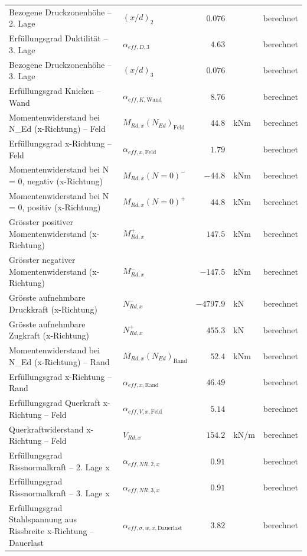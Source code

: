 \documentclass[11pt,a4paper]{article}
\begin{document}
\begin{xltabular}{\linewidth}{>{\raggedright\arraybackslash}Xlrll}
Bezogene Druckzonenhöhe – 2. Lage & $\left(x/d\right)_{2}$ & $0.076$ &  & berechnet \\
Erfüllungsgrad Duktilität – 3. Lage & $\alpha_{eff,D,3}$ & $4.63$ &  & berechnet \\
Bezogene Druckzonenhöhe – 3. Lage & $\left(x/d\right)_{3}$ & $0.076$ &  & berechnet \\
Erfüllungsgrad Knicken – Wand & $\alpha_{eff,K,\text{Wand}}$ & $8.76$ &  & berechnet \\
Momentenwiderstand bei N\_Ed (x-Richtung) – Feld & $M_{Rd,x}(N_{Ed})_{\text{Feld}}$ & $44.8$ & kNm & berechnet \\
Erfüllungsgrad x-Richtung – Feld & $\alpha_{eff,x,\text{Feld}}$ & $1.79$ &  & berechnet \\
Momentenwiderstand bei N = 0, negativ (x-Richtung) & $M_{Rd,x}(N=0)^{-}$ & $-44.8$ & kNm & berechnet \\
Momentenwiderstand bei N = 0, positiv (x-Richtung) & $M_{Rd,x}(N=0)^{+}$ & $44.8$ & kNm & berechnet \\
Grösster positiver Momentenwiderstand (x-Richtung) & $M_{Rd,x}^{+}$ & $147.5$ & kNm & berechnet \\
Grösster negativer Momentenwiderstand (x-Richtung) & $M_{Rd,x}^{-}$ & $-147.5$ & kNm & berechnet \\
Grösste aufnehmbare Druckkraft (x-Richtung) & $N_{Rd,x}^{-}$ & $-4797.9$ & kN & berechnet \\
Grösste aufnehmbare Zugkraft (x-Richtung) & $N_{Rd,x}^{+}$ & $455.3$ & kN & berechnet \\
Momentenwiderstand bei N\_Ed (x-Richtung) – Rand & $M_{Rd,x}(N_{Ed})_{\text{Rand}}$ & $52.4$ & kNm & berechnet \\
Erfüllungsgrad x-Richtung – Rand & $\alpha_{eff,x,\text{Rand}}$ & $46.49$ &  & berechnet \\
Erfüllungsgrad Querkraft x-Richtung – Feld & $\alpha_{eff,V,x,\text{Feld}}$ & $5.14$ &  & berechnet \\
Querkraftwiderstand x-Richtung – Feld & $V_{Rd,x}$ & $154.2$ & kN/m & berechnet \\
Erfüllungsgrad Rissnormalkraft – 2. Lage x & $\alpha_{eff,NR,2,x}$ & $0.91$ &  & berechnet \\
Erfüllungsgrad Rissnormalkraft – 3. Lage x & $\alpha_{eff,NR,3,x}$ & $0.91$ &  & berechnet \\
Erfüllungsgrad Stahlspannung aus Rissbreite x-Richtung – Dauerlast & $\alpha_{eff,\sigma,w,x,\text{Dauerlast}}$ & $3.82$ &  & berechnet \\

\end{xltabular}
\end{document}
